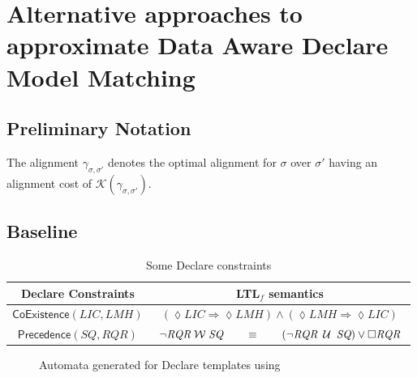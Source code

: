 \section{Alternative approaches to approximate Data Aware Declare Model Matching}
\subsection*{Preliminary Notation}
The alignment $\gamma_{\sigma,\sigma'}$ denotes the optimal alignment for $\sigma$ over $\sigma'$ having an alignment cost of $\mathcal{K}(\gamma_{\sigma,\sigma'})$. 
\subsection{Baseline}


\begin{table}[!t]
	\centering
	\begin{tabular}{c|c}
		\toprule
		Declare Constraints & LTL$_f$ semantics\\
		\midrule
		$\mathsf{CoExistence}(\textit{LIC},\textit{LMH})$ & $(\lozenge\textit{LIC}\Rightarrow\lozenge\textit{LMH})\wedge (\lozenge\textit{LMH}\Rightarrow \lozenge\textit{LIC})$  \\
		
		$\mathsf{Precedence}(\textit{SQ},\textit{RQR})$ & $\neg \textit{RQR}\; \mathcal{W}\; \textit{SQ}\qquad \equiv \qquad (\neg \textit{RQR}\; \mathbin{\mathcal{U}}\; \textit{SQ})\vee \square\textit{RQR} $  \\
		\bottomrule
	\end{tabular}
\caption{Some Declare constraints \cite{LeoniMA12}}
\end{table}



\begin{figure}[!t]
	\centering
	\quad
	\quad
	\caption{Automata generated for Declare templates using \cite{LeoniMA12,DBLP:conf/bpm/Westergaard11}}\label{fig:ma}
\end{figure}

